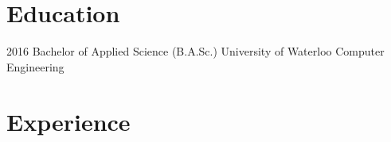 \documentclass[print]{friggeri-cv} %
\begin{document}
\section{Education}

\begin{entrylist}


\entry
{2016}
{}
{Bachelor of Applied Science (B.A.Sc.)}
{University of Waterloo}
{Computer Engineering}


\end{entrylist}


\section{Experience}
\end{document}
